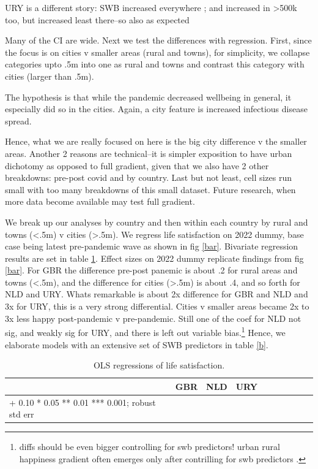 \documentclass[10pt, letterpaper]{article}
\begin{document}
\begin{spacing}{1.4}
URY is a different story: SWB increased everywhere ; and increased in >500k too, but increased least there--so also as expected

Many of the CI are wide. Next we test the differences with regression. First,
since the focus is on cities v smaller areas (rural and towns), for simplicity,
we collapse categories upto .5m into one as rural and towns and contrast this
category with cities (larger than .5m). 


The hypothesis is that while the pandemic decreased wellbeing in general, it
especially did so in the cities. Again, a city feature is increased
infectious disease spread.

Hence, what we are really focused on here is  the big city difference v the
smaller areas. Another 2 reasons are technical--it is simpler exposition to have
urban dichotomy as opposed to full gradient, given that we also have 2 other
breakdowns: pre-post covid and by country. Last but not least, cell sizes run
small with too many breakdowns of this small dataset. Future research, when more
data become available may test full gradient.  


We break up our analyses by country and then within each country by rural and
towns (<.5m) v cities (>.5m). We regress life satisfaction on 2022 dummy, base
case being latest pre-pandemic wave as shown in fig \ref{bar}. 
 Bivariate regression results are set in table \ref{a}.
 Effect sizes on 2022 dummy replicate findings from fig \ref{bar}. For GBR the
 difference pre-post panemic is about .2 for rural areas and towns (<.5m), and
 the difference for cities (>.5m) is about .4, and so forth for NLD and URY.
 Whats remarkable is about 2x difference for GBR and NLD and 3x for URY, this is
 a very strong differential. Cities v smaller areas became 2x to 3x less happy
 post-pandemic v pre-pandemic. 
 Still one of the coef for NLD not sig, and weakly
sig for URY, and there is left out variable bias.\footnote{diffs should be even
  bigger controlling for swb predictors! urban rural happiness gradient often
  emerges only after contrilling for swb predictors \citep{aok21}.} Hence,  we elaborate models with an
extensive set of SWB predictors in table \ref{b}.
 
 
\begin{spacing}{.9} \begin{table}[H]\centering   \begin{scriptsize} \begin{tabular}{p{1.8in}p{.5in}p{.5in}|p{.5in}p{.5in}|p{.5in}p{.5in}|p{.5in}p{.5in}p{.5in}p{.5 in}p{.5in}p{.5 in}}\hline&\multicolumn{2}{c}{GBR}&\multicolumn{2}{c}{NLD}&\multicolumn{2}{c}{URY}\\  \hline + 0.10 * 0.05 ** 0.01 *** 0.001; robust std err \end{tabular}\end{scriptsize}\caption{\label{a}OLS regressions of life satisfaction.}\end{table} \end{spacing}



\end{spacing}
\end{document}
